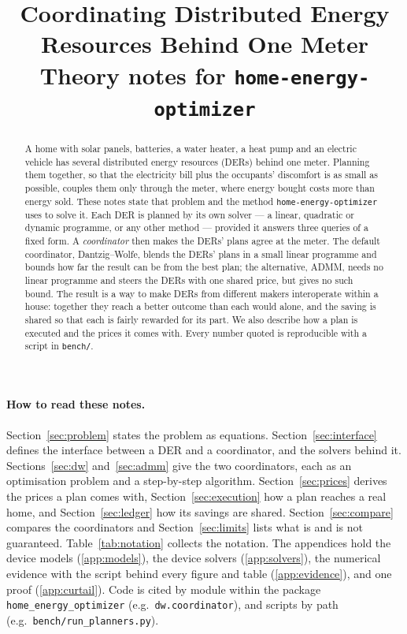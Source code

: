 \documentclass[11pt,a4paper]{article}
\title{Coordinating Distributed Energy Resources Behind One Meter\\
\large Theory notes for \texttt{home-energy-optimizer}}
\author{}
\date{}
\begin{document}
\maketitle

\begin{abstract}
\noindent
A home with solar panels, batteries, a water heater, a heat pump and an
electric vehicle has several distributed energy resources (DERs) behind one
meter. Planning them together, so that the electricity bill plus the
occupants' discomfort is as small as possible, couples them only through the
meter, where energy bought costs more than energy sold. These notes state that
problem and the method \texttt{home-energy-optimizer} uses to solve it. Each DER is
planned by its own solver --- a linear, quadratic or dynamic programme, or any
other method --- provided it answers three queries of a fixed form. A
\emph{coordinator} then makes the DERs' plans agree at the meter. The default
coordinator, Dantzig--Wolfe, blends the DERs' plans in a small linear programme
and bounds how far the result can be from the best plan; the alternative, ADMM,
needs no linear programme and steers the DERs with one shared price, but gives
no such bound. The result is a way to make DERs from different makers
interoperate within a house: together they reach a better outcome than each
would alone, and the saving is shared so that each is fairly rewarded for its
part. We also describe how a plan is executed and the prices it comes with. Every number quoted
is reproducible with a script in \texttt{bench/}.
\end{abstract}

\paragraph{How to read these notes.} Section~\ref{sec:problem} states the
problem as equations. Section~\ref{sec:interface} defines the interface between
a DER and a coordinator, and the solvers behind it.
Sections~\ref{sec:dw} and~\ref{sec:admm} give the two coordinators, each as an
optimisation problem and a step-by-step algorithm. Section~\ref{sec:prices}
derives the prices a plan comes with, Section~\ref{sec:execution} how a plan
reaches a real home, and Section~\ref{sec:ledger} how its savings are shared.
Section~\ref{sec:compare} compares the coordinators and
Section~\ref{sec:limits} lists what is and is not guaranteed.
Table~\ref{tab:notation} collects the notation. The appendices hold the device
models (\ref{app:models}), the device solvers (\ref{app:solvers}), the
numerical evidence with the script behind every figure and table
(\ref{app:evidence}), and one proof (\ref{app:curtail}). Code is cited by module
within the package \texttt{home\_energy\_optimizer} (e.g.\ \texttt{dw.coordinator}),
and scripts by path (e.g.\ \texttt{bench/run\_planners.py}).
\end{document}
